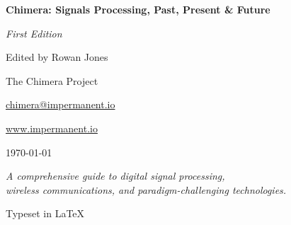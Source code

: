 \begin{titlepage}
    \centering
    \vspace*{2cm}
    
    {\Huge\bfseries\color{NavyBlue} Chimera: Signals Processing, Past, Present \& Future\par}
    \vspace{1cm}
    {\Large\itshape First Edition\par}
    \vspace{0.5cm}
    {\Large Edited by Rowan Jones\par}
    \vspace{0.2cm}
    {\small The Chimera Project\par}
    {\small\href{mailto:chimera@impermanent.io}{chimera@impermanent.io}\par}
    {\small\url{www.impermanent.io}\par}
    \vspace{0.5cm}
    {\large \today\par}
    
    \vspace{2cm}
    
    {\large\itshape
    A comprehensive guide to digital signal processing,\\
    wireless communications, and paradigm-challenging technologies.\par}
    
    \vspace{1cm}
    
    {\small Typeset in \LaTeX{}\par}
    
    \vfill
    
\end{titlepage}
